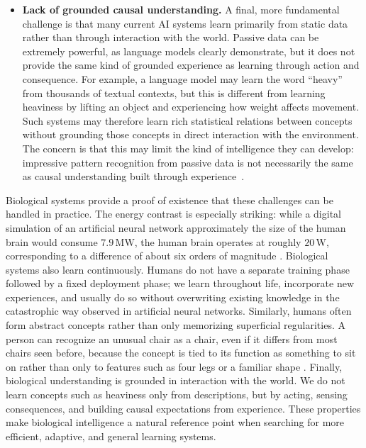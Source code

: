 \begin{itemize}
    \item \textbf{Lack of grounded causal understanding.} A final, more fundamental challenge is that many current AI systems learn primarily from static data rather than through interaction with the world. Passive data can be extremely powerful, as language models clearly demonstrate, but it does not provide the same kind of grounded experience as learning through action and consequence. For example, a language model may learn the word ``heavy'' from thousands of textual contexts, but this is different from learning heaviness by lifting an object and experiencing how weight affects movement. Such systems may therefore learn rich statistical relations between concepts without grounding those concepts in direct interaction with the environment. The concern is that this may limit the kind of intelligence they can develop: impressive pattern recognition from passive data is not necessarily the same as causal understanding built through experience~\parencite{bisk_experience_2020}.

\end{itemize}

Biological systems provide a proof of existence that these challenges can be handled in practice. The energy contrast is especially striking: while a digital simulation of an artificial neural network approximately the size of the human brain would consume \(7.9\,\mathrm{MW}\), the human brain operates at roughly \(20\,\mathrm{W}\), corresponding to a difference of about six orders of magnitude \parencite{mehonic_brain-inspired_2022}. Biological systems also learn continuously. Humans do not have a separate training phase followed by a fixed deployment phase; we learn throughout life, incorporate new experiences, and usually do so without overwriting existing knowledge in the catastrophic way observed in artificial neural networks. Similarly, humans often form abstract concepts rather than only memorizing superficial regularities. A person can recognize an unusual chair as a chair, even if it differs from most chairs seen before, because the concept is tied to its function as something to sit on rather than only to features such as four legs or a familiar shape \parencite{dehaene_how_2021}. Finally, biological understanding is grounded in interaction with the world. We do not learn concepts such as heaviness only from descriptions, but by acting, sensing consequences, and building causal expectations from experience. These properties make biological intelligence a natural reference point when searching for more efficient, adaptive, and general learning systems.

